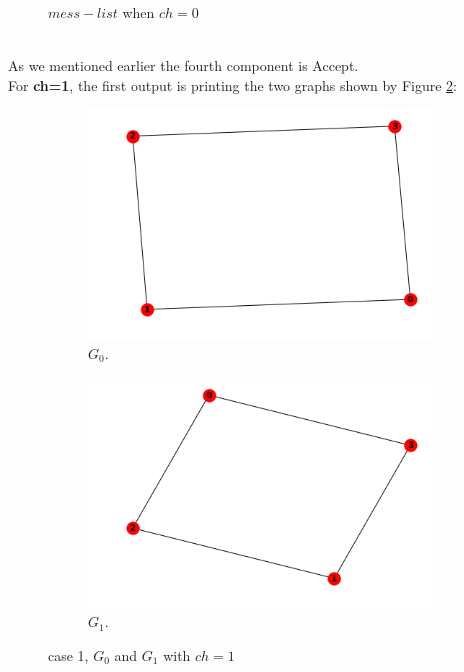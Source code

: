 \documentclass[12pt,a4paper]{article}
\begin{document}
\begin{itemize}
\begin{figure}[h]
 	\caption{$mess-list$ when $ch=0$}
 	\label{fig:3-5}
 \end{figure}\\
As we mentioned earlier the fourth component is Accept.\\
For \textbf{ch=1}, the first output is printing the two graphs shown by Figure \ref{fig:case 1, $G_0$ and $G_1$ with $ch=1$}:
\begin{figure}[h!]
	\centering\begin{subfigure}[b]{.35\linewidth}
		\includegraphics[width=\linewidth]{3-6.png}
		\caption{$G_0$.}
	\end{subfigure}
	\begin{subfigure}[b]{.35\linewidth}
		\includegraphics[width=\linewidth]{3-7.png}
		\caption{$G_1$.}
	\end{subfigure}
	\caption{case 1, $G_0$ and $G_1$ with $ch=1$}
	\label{fig:case 1, $G_0$ and $G_1$ with $ch=1$}

\end{figure}
\end{itemize}
\end{document}
